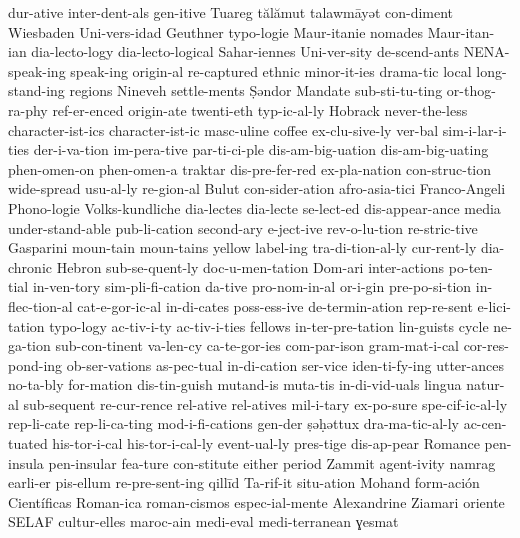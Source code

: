 {dur-ative
inter-dent-als
gen-itive
Tuareg
tălămut
talawmāyət
con-diment
Wiesbaden
Uni-vers-idad
Geuthner
typo-logie
Maur-itanie
nomades
Maur-itan-ian
dia-lecto-logy
dia-lecto-logical
Sahar-iennes
Uni-ver-sity
de-scend-ants
NENA-speak-ing
speak-ing
origin-al
re-captured
ethnic
minor-it-ies
drama-tic
local
long-stand-ing
regions
Nineveh
settle-ments
Ṣəndor
Mandate
sub-sti-tu-ting
or-thog-ra-phy
ref-er-enced
origin-ate
twenti-eth
typ-ic-al-ly
Hobrack
never-the-less
character-ist-ics
character-ist-ic
masc-uline
coffee
ex-clu-sive-ly
ver-bal
sim-i-lar-i-ties
der-i-va-tion
im-pera-tive
par-ti-ci-ple
dis-am-big-uation
dis-am-big-uating
phen-omen-on
phen-omen-a
traktar
dis-pre-fer-red
ex-pla-nation
con-struc-tion
wide-spread
usu-al-ly
re-gion-al
Bulut
con-sider-ation
afro-asia-tici
Franco-Angeli
Phono-logie
Volks-kundliche
dia-lectes
dia-lecte
se-lect-ed
dis-appear-ance
media
under-stand-able
pub-li-cation
second-ary
e-ject-ive
rev-o-lu-tion
re-stric-tive
Gasparini
moun-tain
moun-tains
yellow
label-ing
tra-di-tion-al-ly
cur-rent-ly
dia-chronic
Hebron
sub-se-quent-ly
doc-u-men-tation
Dom-ari
inter-actions
po-ten-tial
in-ven-tory
sim-pli-fi-cation
da-tive
pro-nom-in-al
or-i-gin
pre-po-si-tion
in-flec-tion-al
cat-e-gor-ic-al
in-di-cates
poss-ess-ive
de-termin-ation
rep-re-sent
e-lici-tation
typo-logy
ac-tiv-i-ty
ac-tiv-i-ties
fellows
in-ter-pre-tation
lin-guists
cycle
ne-ga-tion
sub-con-tinent
va-len-cy
ca-te-gor-ies
com-par-ison
gram-mat-i-cal
cor-res-pond-ing
ob-ser-vations
as-pec-tual
in-di-cation
ser-vice
iden-ti-fy-ing
utter-ances
no-ta-bly
for-mation
dis-tin-guish
mutand-is
muta-tis
in-di-vid-uals
lingua
natur-al
sub-sequent
re-cur-rence
rel-ative
rel-atives
mil-i-tary
ex-po-sure
spe-cif-ic-al-ly
rep-li-cate
rep-li-ca-ting
mod-i-fi-cations
gen-der
ṣəḥəttux
dra-ma-tic-al-ly
ac-cen-tuated
his-tor-i-cal
his-tor-i-cal-ly
event-ual-ly
pres-tige
dis-ap-pear
Romance
pen-insula
pen-insular
fea-ture
con-stitute
either
period
Zammit
agent-ivity
namrag
earli-er
pis-ellum
re-pre-sent-ing
qillīd
Ta-rif-it
situ-ation
Mohand
form-ación
Científicas
Roman-ica
roman-cismos
espec-ial-mente
Alexandrine
Ziamari
oriente
SELAF
cultur-elles
maroc-ain
medi-eval
medi-terranean
ɣesmat
}